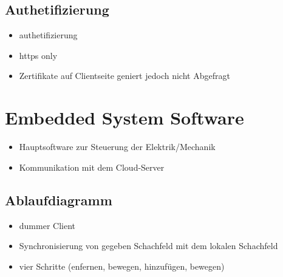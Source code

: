\hypertarget{authetifizierung}{%
\subsection{Authetifizierung}\label{authetifizierung}}

\begin{itemize}
\tightlist
\item
  authetifizierung
\item
  https only
\item
  Zertifikate auf Clientseite geniert jedoch nicht Abgefragt
\end{itemize}

\hypertarget{embedded-system-software}{%
\section{Embedded System Software}\label{embedded-system-software}}

\begin{itemize}
\tightlist
\item
  Hauptsoftware zur Steuerung der Elektrik/Mechanik
\item
  Kommunikation mit dem Cloud-Server
\end{itemize}

\hypertarget{ablaufdiagramm}{%
\subsection{Ablaufdiagramm}\label{ablaufdiagramm}}

\begin{itemize}
\item
  dummer Client
\item
  Synchronisierung von gegeben Schachfeld mit dem lokalen Schachfeld
\item
  vier Schritte (enfernen, bewegen, hinzufügen, bewegen)
\end{itemize}

